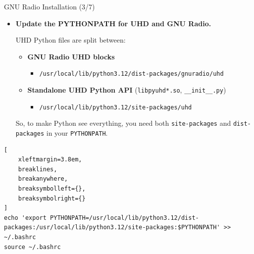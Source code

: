 \begin{frame}[fragile]{GNU Radio Installation (3/7)}
\vspace{-1.5cm}
\footnotesize

\begin{itemize}
    \item \textbf{Update the PYTHONPATH for UHD and GNU Radio.}

        \scriptsize
        UHD Python files are split between:

        \begin{itemize}
            \item \textbf{GNU Radio UHD blocks}
            \begin{itemize}
                \item \texttt{/usr/local/lib/python3.12/dist-packages/gnuradio/uhd}
            \end{itemize}

            \item \textbf{Standalone UHD Python API}
            (\texttt{libpyuhd*.so}, \texttt{\_\_init\_\_.py})
            \begin{itemize}
                \item \texttt{/usr/local/lib/python3.12/site-packages/uhd}
            \end{itemize}
        \end{itemize}
\vspace{0.5cm}
        So, to make Python see everything, you need both
        \texttt{site-packages} and \texttt{dist-packages}
        in your \texttt{PYTHONPATH}.
    \end{itemize}

\vspace{0.2cm}

\scriptsize
\begin{Verbatim}[
    xleftmargin=3.8em,
    breaklines,
    breakanywhere,
    breaksymbolleft={},
    breaksymbolright={}
]
echo 'export PYTHONPATH=/usr/local/lib/python3.12/dist-packages:/usr/local/lib/python3.12/site-packages:$PYTHONPATH' >> ~/.bashrc
source ~/.bashrc
\end{Verbatim}

\end{frame}